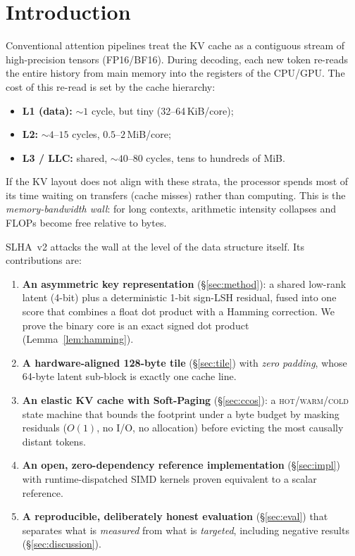 \documentclass[11pt]{article}
\theoremstyle{plain}
\theoremstyle{definition}
\begin{document}
\section{Introduction}
\label{sec:intro}

Conventional attention pipelines treat the KV cache as a contiguous
stream of high-precision tensors (FP16/BF16). During decoding, each new
token re-reads the entire history from main memory into the registers of
the CPU/GPU. The cost of this re-read is set by the cache hierarchy:

\begin{itemize}[leftmargin=1.4em,itemsep=2pt]
  \item \textbf{L1 (data):} $\sim\!1$ cycle, but tiny (32--64\,KiB/core);
  \item \textbf{L2:} $\sim\!4$--$15$ cycles, $0.5$--$2$\,MiB/core;
  \item \textbf{L3 / LLC:} shared, $\sim\!40$--$80$ cycles, tens to
    hundreds of MiB.
\end{itemize}

If the KV layout does not align with these strata, the processor spends
most of its time waiting on transfers (cache misses) rather than
computing. This is the \emph{memory-bandwidth wall}: for long contexts,
arithmetic intensity collapses and FLOPs become free relative to bytes.

SLHA~v2 attacks the wall at the level of the data structure itself. Its
contributions are:

\begin{enumerate}[leftmargin=1.6em,itemsep=2pt]
  \item \textbf{An asymmetric key representation} (\S\ref{sec:method}):
    a shared low-rank latent (4-bit) plus a deterministic 1-bit
    sign-LSH residual, fused into one score that combines a float dot
    product with a Hamming correction. We prove the binary core is an
    exact signed dot product (Lemma~\ref{lem:hamming}).
  \item \textbf{A hardware-aligned 128-byte tile}
    (\S\ref{sec:tile}) with \emph{zero padding}, whose 64-byte latent
    sub-block is exactly one cache line.
  \item \textbf{An elastic KV cache with Soft-Paging}
    (\S\ref{sec:ccos}): a \textsc{hot}/\textsc{warm}/\textsc{cold}
    state machine that bounds the footprint under a byte budget by
    masking residuals ($O(1)$, no I/O, no allocation) before evicting
    the most causally distant tokens.
  \item \textbf{An open, zero-dependency reference implementation}
    (\S\ref{sec:impl}) with runtime-dispatched SIMD kernels proven
    equivalent to a scalar reference.
  \item \textbf{A reproducible, deliberately honest evaluation}
    (\S\ref{sec:eval}) that separates what is \emph{measured} from what
    is \emph{targeted}, including negative results
    (\S\ref{sec:discussion}).
\end{enumerate}
\end{document}
